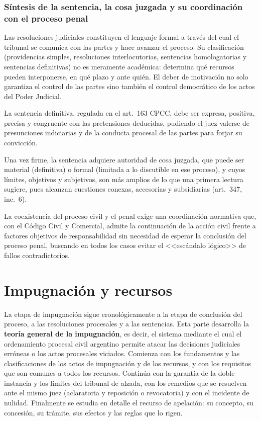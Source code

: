 \documentclass[12pt,oneside]{book}
\begin{document}
\section{Síntesis de la sentencia, la cosa juzgada y su coordinación con el proceso penal}
Las resoluciones judiciales constituyen el lenguaje formal a través del cual el tribunal se comunica con las partes y hace avanzar el proceso. Su clasificación (providencias simples, resoluciones interlocutorias, sentencias homologatorias y sentencias definitivas) no es meramente académica: determina qué recursos pueden interponerse, en qué plazo y ante quién. El deber de motivación no solo garantiza el control de las partes sino también el control democrático de los actos del Poder Judicial.

La sentencia definitiva, regulada en el art.~163 CPCC, debe ser expresa, positiva, precisa y congruente con las pretensiones deducidas, pudiendo el juez valerse de presunciones indiciarias y de la conducta procesal de las partes para forjar su convicción.

Una vez firme, la sentencia adquiere autoridad de cosa juzgada, que puede ser material (definitiva) o formal (limitada a lo discutible en ese proceso), y cuyos límites, objetivos y subjetivos, son más amplios de lo que una primera lectura sugiere, pues alcanzan cuestiones conexas, accesorias y subsidiarias (art.~347, inc.~6\textordmasculine).

La coexistencia del proceso civil y el penal exige una coordinación normativa que, con el Código Civil y Comercial, admite la continuación de la acción civil frente a factores objetivos de responsabilidad sin necesidad de esperar la conclusión del proceso penal, buscando en todos los casos evitar el <<escándalo lógico>> de fallos contradictorios.

\part{Impugnación y recursos}\label{pt:impugnacion}
La etapa de impugnación sigue cronológicamente a la etapa de conclusión del proceso, a las resoluciones procesales y a las sentencias. Esta parte desarrolla la \textbf{teoría general de la impugnación}, es decir, el sistema mediante el cual el ordenamiento procesal civil argentino permite atacar las decisiones judiciales erróneas o los actos procesales viciados. Comienza con los fundamentos y las clasificaciones de los actos de impugnación y de los recursos, y con los requisitos que son comunes a todos los recursos. Continúa con la garantía de la doble instancia y los límites del tribunal de alzada, con los remedios que se resuelven ante el mismo juez (aclaratoria y reposición o revocatoria) y con el incidente de nulidad. Finalmente se estudia en detalle el recurso de apelación: su concepto, su concesión, su trámite, sus efectos y las reglas que lo rigen.
\end{document}
